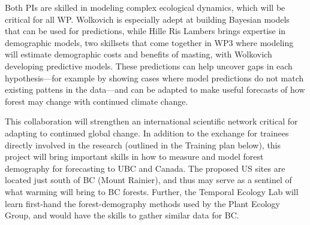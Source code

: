 \documentclass[12pt,oneside]{article}
\begin{document}
Both PIs are skilled in modeling complex ecological dynamics, which will be critical for all WP. Wolkovich is especially adept at building Bayesian models that can be used for predictions,\cite{ospreebbms,dan2021je,decsens,morales2024phylogenetic} while Hille Ris Lambers brings expertise in demographic models,\cite{hille2002density,clark2003estimating,ford2020soil} two skillsets that come together in WP3 where modeling will estimate demographic costs and benefits of masting, with Wolkovich developing predictive models. These predictions can help uncover gaps in each hypothesis---for example by showing cases where model predictions do not match existing pattens in the data---and can be adapted to make useful forecasts of how forest may change with continued climate change.\cite{IPCC:2014sm} %

This collaboration will strengthen an international scientific network critical for adapting to continued global change. In addition to the exchange for trainees directly involved in the research (outlined in the Training plan below), this project will bring important skills in how to measure and model forest demography for forecasting to UBC and Canada. The proposed US sites are located just south of BC (Mount Rainier), and thus may serve as a sentinel of what warming will bring to BC forests. Further, the Temporal Ecology Lab will learn first-hand the forest-demography methods used by the Plant Ecology Group, and would have the skills to gather similar data for BC. %
\end{document}
